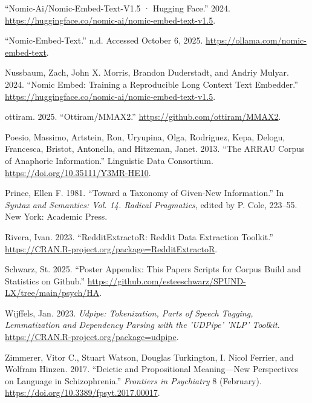 \documentclass[
  12pt,
  oneside]{book}
\newlength{\cslhangindent}
\newenvironment{CSLReferences}[2] %
 {\begin{list}{}{%
  \setlength{\itemindent}{0pt}
  \setlength{\leftmargin}{0pt}
  \setlength{\parsep}{0pt}
  \ifodd #1
   \setlength{\leftmargin}{\cslhangindent}
   \setlength{\itemindent}{-1\cslhangindent}
  \fi
  \setlength{\itemsep}{#2\baselineskip}}}
 {\end{list}}
\begin{document}
\begin{CSLReferences}{1}{0}
{``Nomic-Ai/Nomic-Embed-Text-V1.5 · {Hugging} {Face}.''} 2024. \url{https://huggingface.co/nomic-ai/nomic-embed-text-v1.5}.

{``Nomic-Embed-Text.''} n.d. Accessed October 6, 2025. \url{https://ollama.com/nomic-embed-text}.

Nussbaum, Zach, John X. Morris, Brandon Duderstadt, and Andriy Mulyar. 2024. {``Nomic {Embed}: {Training} a {Reproducible} {Long} {Context} {Text} {Embedder}.''} \url{https://huggingface.co/nomic-ai/nomic-embed-text-v1.5}.

ottiram. 2025. {``Ottiram/{MMAX2}.''} \url{https://github.com/ottiram/MMAX2}.

Poesio, Massimo, Artstein, Ron, Uryupina, Olga, Rodriguez, Kepa, Delogu, Francesca, Bristot, Antonella, and Hitzeman, Janet. 2013. {``The {ARRAU} {Corpus} of {Anaphoric} {Information}.''} Linguistic Data Consortium. \url{https://doi.org/10.35111/Y3MR-HE10}.

Prince, Ellen F. 1981. {``Toward a Taxonomy of Given-New Information.''} In \emph{Syntax and Semantics: {Vol}. 14. {Radical} {Pragmatics}}, edited by P. Cole, 223--55. New York: Academic Press.

Rivera, Ivan. 2023. {``{RedditExtractoR}: {Reddit} {Data} {Extraction} {Toolkit}.''} \url{https://CRAN.R-project.org/package=RedditExtractoR}.

Schwarz, St. 2025. {``Poster Appendix: This Papers Scripts for Corpus Build and Statistics on Github.''} \url{https://github.com/esteeschwarz/SPUND-LX/tree/main/psych/HA}.

Wijffels, Jan. 2023. \emph{Udpipe: {Tokenization}, {Parts} of {Speech} {Tagging}, {Lemmatization} and {Dependency} {Parsing} with the '{UDPipe}' '{NLP}' {Toolkit}}. \url{https://CRAN.R-project.org/package=udpipe}.

Zimmerer, Vitor C., Stuart Watson, Douglas Turkington, I. Nicol Ferrier, and Wolfram Hinzen. 2017. {``Deictic and {Propositional} {Meaning}---{New} {Perspectives} on {Language} in {Schizophrenia}.''} \emph{Frontiers in Psychiatry} 8 (February). \url{https://doi.org/10.3389/fpsyt.2017.00017}.

\end{CSLReferences}
\end{document}
